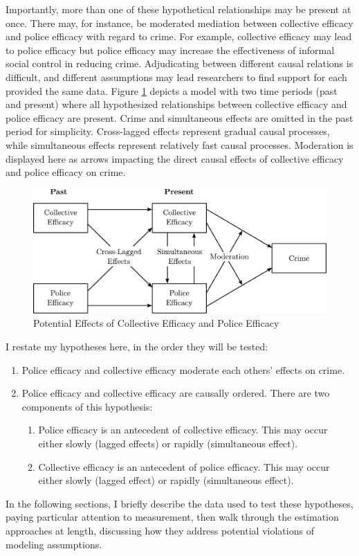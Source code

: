 \documentclass [11pt, proquest] {uwthesis}[2015/03/03]
\providecommand{\tightlist}{%
  \setlength{\itemsep}{0pt}\setlength{\parskip}{0pt}}
\begin{document}
Importantly, more than one of these hypothetical relationships may be present at once. There may, for instance, be moderated mediation between collective efficacy and police efficacy with regard to crime. For example, collective efficacy may lead to police efficacy but police efficacy may increase the effectiveness of informal social control in reducing crime. Adjudicating between different causal relations is difficult, and different assumptions may lead researchers to find support for each provided the same data. Figure \ref{fig:fclongitudinalmodel} depicts a model with two time periods (past and present) where all hypothesized relationships between collective efficacy and police efficacy are present. Crime and simultaneous effects are omitted in the past period for simplicity. Cross-lagged effects represent gradual causal processes, while simultaneous effects represent relatively fast causal processes. Moderation is displayed here as arrows impacting the direct causal effects of collective efficacy and police efficacy on crime.
\begin{figure}

{\centering \includegraphics[width=0.9\linewidth]{./figure/ch3/longitudinal_model} 

}

\caption{Potential Effects of Collective Efficacy and Police Efficacy}\label{fig:fclongitudinalmodel}
\end{figure}
I restate my hypotheses here, in the order they will be tested:
\begin{enumerate}
\def\labelenumi{\arabic{enumi}.}
\tightlist
\item
  Police efficacy and collective efficacy moderate each others' effects on crime.
\item
  Police efficacy and collective efficacy are causally ordered. There are two components of this hypothesis:
  \begin{enumerate}
  \def\labelenumii{\alph{enumii}.}
  \tightlist
  \item
    Police efficacy is an antecedent of collective efficacy. This may occur either slowly (lagged effects) or rapidly (simultaneous effect).
  \item
    Collective efficacy is an antecedent of police efficacy. This may occur either slowly (lagged effect) or rapidly (simultaneous effect).
  \end{enumerate}
\end{enumerate}
In the following sections, I briefly describe the data used to test these hypotheses, paying particular attention to measurement, then walk through the estimation approaches at length, discussing how they address potential violations of modeling assumptions.
\end{document}
